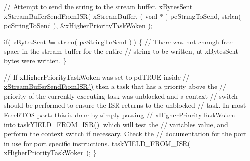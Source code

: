 \begin{DoxyPre}    // Attempt to send the string to the stream buffer.
    xBytesSent = xStreamBufferSendFromISR( xStreamBuffer,
                                           ( void * ) pcStringToSend,
                                           strlen( pcStringToSend ),
                                           \&xHigherPriorityTaskWoken );\end{DoxyPre}



\begin{DoxyPre}    if( xBytesSent != strlen( pcStringToSend ) )
    \{
        // There was not enough free space in the stream buffer for the entire
        // string to be written, ut xBytesSent bytes were written.
    \}\end{DoxyPre}



\begin{DoxyPre}    // If xHigherPriorityTaskWoken was set to pdTRUE inside
    // \mbox{\hyperlink{stream__buffer_8h_a1dab226e99230e01e79bc2b5c0605e44}{xStreamBufferSendFromISR()}} then a task that has a priority above the
    // priority of the currently executing task was unblocked and a context
    // switch should be performed to ensure the ISR returns to the unblocked
    // task.  In most FreeRTOS ports this is done by simply passing
    // xHigherPriorityTaskWoken into taskYIELD\_FROM\_ISR(), which will test the
    // variables value, and perform the context switch if necessary.  Check the
    // documentation for the port in use for port specific instructions.
    taskYIELD\_FROM\_ISR( xHigherPriorityTaskWoken );
\}
\end{DoxyPre}
 
